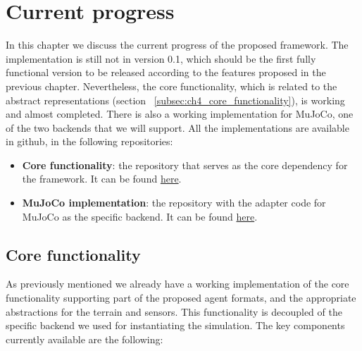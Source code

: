 
\chapter{Current progress}
\label{ch:current_progress}




In this chapter we discuss the current progress of the proposed framework. 
The implementation is still not in version 0.1, which should be the first 
fully functional version to be released according to the features proposed 
in the previous chapter. Nevertheless, the core functionality, which is related
to the abstract representations (section ~\ref{subsec:ch4_core_functionality}),
is working and almost completed. There is also a working implementation for
MuJoCo, one of the two backends that we will support. All the implementations 
are available in github, in the following repositories:

\begin{itemize}
    \item \textbf{Core functionality}: the repository that serves as the
          core dependency for the framework. It can be found \href{https://github.com/wpumacay/tysocCore}{here}.
    \item \textbf{MuJoCo implementation}: the repository with the
          adapter code for MuJoCo as the specific backend. It can be found
          \href{https://github.com/wpumacay/tysocMjc}{here}.
\end{itemize}

\section{Core functionality}

As previously mentioned we already have a working implementation of the core
functionality supporting part of the proposed agent formats, and the appropriate
abstractions for the terrain and sensors. This functionality is decoupled of the 
specific backend we used for instantiating the simulation. The key components currently 
available are the following:

